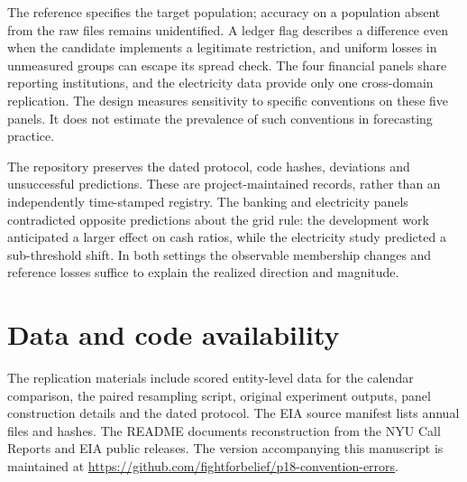\documentclass[linenumber]{jdsart}
\begin{document}
The reference specifies the target population; accuracy on a population absent from the raw files remains unidentified. A ledger flag describes a difference even when the candidate implements a legitimate restriction, and uniform losses in unmeasured groups can escape its spread check. The four financial panels share reporting institutions, and the electricity data provide only one cross-domain replication. The design measures sensitivity to specific conventions on these five panels. It does not estimate the prevalence of such conventions in forecasting practice.

The repository preserves the dated protocol, code hashes, deviations and unsuccessful predictions. These are project-maintained records, rather than an independently time-stamped registry. The banking and electricity panels contradicted opposite predictions about the grid rule: the development work anticipated a larger effect on cash ratios, while the electricity study predicted a sub-threshold shift. In both settings the observable membership changes and reference losses suffice to explain the realized direction and magnitude.

\section*{Data and code availability}
The replication materials include scored entity-level data for the calendar comparison, the paired resampling script, original experiment outputs, panel construction details and the dated protocol. The EIA source manifest lists annual files and hashes. The README documents reconstruction from the NYU Call Reports and EIA public releases. The version accompanying this manuscript is maintained at \url{https://github.com/fightforbelief/p18-convention-errors}.
\end{document}
